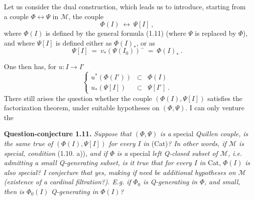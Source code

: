 \documentclass[11pt]{article}
\newcommand{\msp}[1]{\marginpar{\footnotesize [#1]}}
\newcommand{\clos}{\longleftrightarrow}
\newcommand{\fl}{\longrightarrow}
\begin{document}
Let us consider the dual construction, which leads us to introduce, starting from a couple $\Phi \clos \Psi$ in $\mathcal{M}$, the couple
\[
\Phi(I) \ \clos\ \Psi[I]\ , \tag*{(1.20)}
\]
where $\Phi(I)$ is defined by the general formula (1.11) (where $\Psi$ is replaced by $\Phi$), and where $\Psi[I]$ is defined either as $\Phi(I)_{*}$, or as
\[
\Psi[I] \ =\ v_{*}(\Psi(I_0))^{-} \ =\ \Phi(I)_{*}\ . \tag*{(1.21)}
\]

\msp{page 12}
One then has, for $u : I \fl I'$
\[
\left\{
\begin{array}{rcl}
u^{*}(\Phi(I')) & \subset & \Phi(I) \\
u_{*}(\Psi[I]) & \subset & \Psi[I']\ .
\end{array}
\right.
\tag*{(1.22)}
\]
There still arises the question whether the couple $(\Phi(I), \Psi[I])$ satisfies the factorization theorem, under suitable hypotheses on $(\Phi, \Psi)$. I can only venture the

\textbf{Question-conjecture 1.11.} \textit{Suppose that $(\Phi, \Psi)$ is a} special \textit{Quillen couple, is the same true of $(\Phi(I), \Psi[I])$ for every $I$ in} (Cat)\textit{? In other words, if $\mathcal{M}$ is special, condition} (1.10. a))\textit{, and if $\Phi$ is a} special \textit{left Q-closed subset of $\mathcal{M}$, i.e. admitting a small Q-generating subset, is it true that for every $I$ in} Cat, \textit{$\Phi(I)$ is also special? I conjecture that yes, making if need be additional hypotheses on $\mathcal{M}$ (existence of a cardinal filtration?). E.g. if $\Phi_0$ is Q-generating in $\Phi$, and small, then is $\Phi_0(I)$ Q-generating in $\Phi(I)$?}
\end{document}
